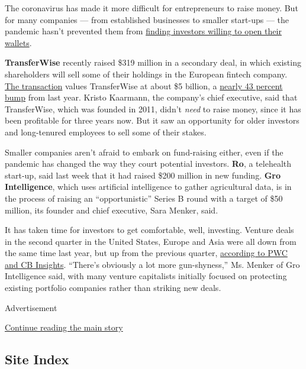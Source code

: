 The coronavirus has made it more difficult for entrepreneurs to raise
money. But for many companies --- from established businesses to smaller
start-ups --- the pandemic hasn't prevented them from
\href{https://www.nytimes.com/2020/08/03/business/dealbook/tiktok-microsoft-takeover.html}{finding
investors willing to open their wallets}.

\textbf{TransferWise} recently raised \$319 million in a secondary deal,
in which existing shareholders will sell some of their holdings in the
European fintech company.
\href{https://techcrunch.com/2020/07/28/transferwise-five-unicorns/}{The
transaction} values TransferWise at about \$5 billion, a
\href{https://www.forbes.com/sites/samshead/2019/05/22/transferwise-valued-at-35-billion-as-founders-sell-stake/}{nearly
43 percent bump} from last year. Kristo Kaarmann, the company's chief
executive, said that TransferWise, which was founded in 2011, didn't
\emph{need} to raise money, since it has been profitable for three years
now. But it saw an opportunity for older investors and long-tenured
employees to sell some of their stakes.

Smaller companies aren't afraid to embark on fund-raising either, even
if the pandemic has changed the way they court potential investors.
\textbf{Ro}, a telehealth start-up, said last week that it had raised
\$200 million in new funding. \textbf{Gro Intelligence}, which uses
artificial intelligence to gather agricultural data, is in the process
of raising an ``opportunistic'' Series B round with a target of \$50
million, its founder and chief executive, Sara Menker, said.

It has taken time for investors to get comfortable, well, investing.
Venture deals in the second quarter in the United States, Europe and
Asia were all down from the same time last year, but up from the
previous quarter,
\href{https://t.yesware.com/tt/e001b3127892bff3127c5684106b4fface2be613/6d096e53b8a44a013ebee1131ad0c628/67276689dfad2ab3eddda9aeeb223346/www.cbinsights.com/research/report/venture-capital-q2-2020/}{according
to PWC and CB Insights}. ``There's obviously a lot more gun-shyness,''
Ms. Menker of Gro Intelligence said, with many venture capitalists
initially focused on protecting existing portfolio companies rather than
striking new deals.

Advertisement

\protect\hyperlink{after-bottom}{Continue reading the main story}

\hypertarget{site-index}{%
\subsection{Site Index}\label{site-index}}

